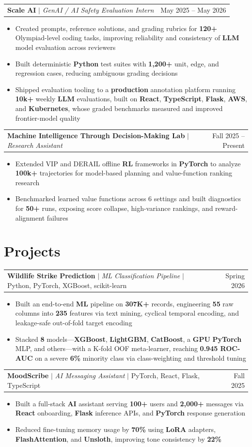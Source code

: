 \documentclass[letterpaper,10pt]{article}
\makeatletter
\newcommand{\resumeWorkHeading}[2]{%
  \vspace{2pt}\noindent
  \begin{tabular*}{\textwidth}{@{}l@{\extracolsep{\fill}}r@{}}
    #1 & #2 \\
  \end{tabular*}%
  \vspace{-2pt}
}
\newcommand{\resumeItemListStart}{\begin{itemize}}
\newcommand{\resumeItemListEnd}{\end{itemize}\vspace{3pt}}
\newcommand{\resumeItem}[1]{\item #1}
\makeatother
\begin{document}
\resumeWorkHeading
{\textbf{Scale AI} $|$ \emph{GenAI / AI Safety Evaluation Intern}}{May 2025 -- May 2026}
\resumeItemListStart
\resumeItem{Created prompts, reference solutions, and grading rubrics for \textbf{120+} Olympiad-level coding tasks, improving reliability and consistency of \textbf{LLM} model evaluation across reviewers}
\resumeItem{Built deterministic \textbf{Python} test suites with \textbf{1,200+} unit, edge, and regression cases, reducing ambiguous grading decisions}
\resumeItem{Shipped evaluation tooling to a \textbf{production} annotation platform running \textbf{10k+} weekly \textbf{LLM} evaluations, built on \textbf{React}, \textbf{TypeScript}, \textbf{Flask}, \textbf{AWS}, and \textbf{Kubernetes}, whose graded benchmarks measured and improved frontier-model quality}
\resumeItemListEnd

\resumeWorkHeading
{\textbf{Machine Intelligence Through Decision-Making Lab} $|$ \emph{Research Assistant}}{Fall 2025 -- Present}
\resumeItemListStart
\resumeItem{Extended VIP and DERAIL offline \textbf{RL} frameworks in \textbf{PyTorch} to analyze \textbf{100k+} trajectories for model-based planning and value-function ranking research}
\resumeItem{Benchmarked learned value functions across 6 settings and built diagnostics for \textbf{50+} runs, exposing score collapse, high-variance rankings, and reward-alignment failures}
\resumeItemListEnd

\section{Projects}
\resumeWorkHeading
{\textbf{Wildlife Strike Prediction} $|$ \emph{ML Classification Pipeline} $|$ Python, PyTorch, XGBoost, scikit-learn}{Spring 2026}
\resumeItemListStart
\resumeItem{Built an end-to-end \textbf{ML} pipeline on \textbf{307K+} records, engineering \textbf{55} raw columns into \textbf{235} features via text mining, cyclical temporal encoding, and leakage-safe out-of-fold target encoding}
\resumeItem{Stacked \textbf{8} models---\textbf{XGBoost}, \textbf{LightGBM}, \textbf{CatBoost}, a \textbf{GPU} \textbf{PyTorch} MLP, and others---with a K-fold OOF meta-learner, reaching \textbf{0.945 ROC-AUC} on a severe \textbf{6\%} minority class via class-weighting and threshold tuning}
\resumeItemListEnd

\resumeWorkHeading
{\textbf{MoodScribe} $|$ \emph{AI Messaging Assistant} $|$ PyTorch, React, Flask, TypeScript}{Fall 2025}
\resumeItemListStart
\resumeItem{Built a full-stack \textbf{AI} assistant serving \textbf{100+} users and \textbf{2,000+} messages via \textbf{React} onboarding, \textbf{Flask} inference APIs, and \textbf{PyTorch} response generation}
\resumeItem{Reduced fine-tuning memory usage by \textbf{70\%} using \textbf{LoRA} adapters, \textbf{FlashAttention}, and \textbf{Unsloth}, improving tone consistency by \textbf{22\%}}
\resumeItemListEnd
\end{document}

